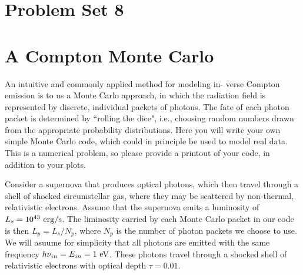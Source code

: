 \documentclass[11pt]{article}
\begin{document}
\pagestyle{empty}

\section*{\centering Problem Set 8}

\section{A Compton Monte Carlo}

An intuitive and commonly applied method for modeling in- verse Compton
emission is to us a Monte Carlo approach, in which the radiation field is
represented by discrete, individual packets of photons. The fate of each photon
packet is determined by ``rolling the dice", i.e., choosing random numbers drawn
from the appropriate probability distributions. Here you will write your own
simple Monte Carlo code, which could in principle be used to model real data.
This is a numerical problem, so please provide a printout of your code, in
addition to your plots.

Consider a supernova that produces optical photons, which then travel through a
shell of shocked circumstellar gas, where they may be scattered by non-thermal,
relativistic electrons. Assume that the supernova emits a luminosity of
$L_s=10^{43}~{\rm erg}/{\rm s}$.  The liminosity carried by each Monte
Carlo packet in our code is then $L_p=L_s/N_p$, where $N_p$ is the number of
photon packets we choose to use.  We will asuume for simplicity that all photons are emitted with
the same frequency $h\nu_{in}=E_{in}=1~{\rm eV}$.  
These photons travel through a shocked shell of relativistic electrons with optical depth
$\tau=0.01$.
\end{document}
